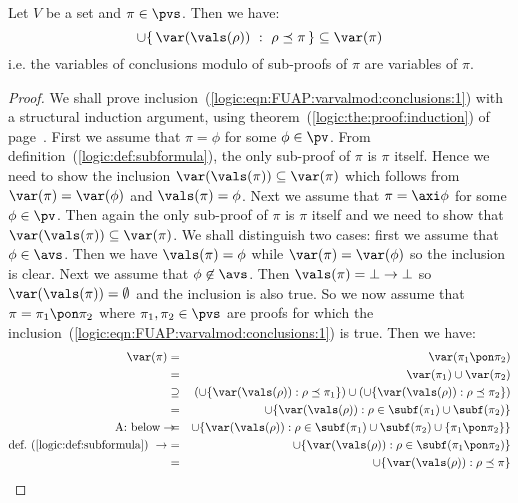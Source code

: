 \begin{prop}\label{logic:prop:FUAP:varvalmod:conclusions:sub:proof}
Let $V$ be a set and $\pi\in\pvs$. Then we have:
    \begin{equation}\label{logic:eqn:FUAP:varvalmod:conclusions:1}
    \cup\{\,\var(\vals(\rho))\ :\
    \rho\preceq\pi\,\}\subseteq\var(\pi)
    \end{equation}
i.e. the variables of conclusions modulo of sub-proofs of $\pi$ are
variables of $\pi$.
\end{prop}
\begin{proof}
We shall prove
inclusion~(\ref{logic:eqn:FUAP:varvalmod:conclusions:1}) with a
structural induction argument, using
theorem~(\ref{logic:the:proof:induction}) of
page~\pageref{logic:the:proof:induction}. First we assume that
$\pi=\phi$ for some $\phi\in\pv$. From
definition~(\ref{logic:def:subformula}), the only sub-proof of $\pi$
is $\pi$ itself. Hence we need to show the inclusion
$\var(\vals(\pi))\subseteq\var(\pi)$ which follows from
$\var(\pi)=\var(\phi)$ and $\vals(\pi)=\phi$. Next we assume that
$\pi=\axi\phi$ for some $\phi\in\pv$. Then again the only sub-proof
of $\pi$ is $\pi$ itself and we need to show that
$\var(\vals(\pi))\subseteq\var(\pi)$. We shall distinguish two
cases: first we assume that $\phi\in\avs$. Then we have
$\vals(\pi)=\phi$ while $\var(\pi)=\var(\phi)$ so the inclusion is
clear. Next we assume that $\phi\not\in\avs$. Then
$\vals(\pi)=\bot\to\bot$ so $\var(\vals(\pi))=\emptyset$ and the
inclusion is also true. So we now assume that
$\pi=\pi_{1}\pon\pi_{2}$ where $\pi_{1},\pi_{2}\in\pvs$ are proofs
for which the
inclusion~(\ref{logic:eqn:FUAP:varvalmod:conclusions:1}) is true.
Then we have:
    \begin{eqnarray*}
    \var(\pi)&=&\var(\pi_{1}\pon\pi_{2})\\
    &=&\var(\pi_{1})\cup\var(\pi_{2})\\
    &\supseteq&(\cup\{\var(\vals(\rho)):\rho\preceq\pi_{1}\})
    \cup(\cup\{\var(\vals(\rho)):\rho\preceq\pi_{2}\})\\
    &=&\cup\{\var(\vals(\rho)):\rho\in\subf(\pi_{1})\cup\subf(\pi_{2})\}\\
    \mbox{A: below}\rightarrow\!\!\!\!
    &=&\cup\{\var(\vals(\rho)):\rho\in\subf(\pi_{1})\cup\subf(\pi_{2})
    \cup\{\pi_{1}\pon\pi_{2}\}\}\\
    \mbox{def.~(\ref{logic:def:subformula})}\ \rightarrow
    &=&\cup\{\var(\vals(\rho)):\rho\in\subf(\pi_{1}\pon\pi_{2})\}\\
    &=&\cup\{\var(\vals(\rho)):\rho\preceq\pi\}\\

\end{eqnarray*}
\end{proof}
